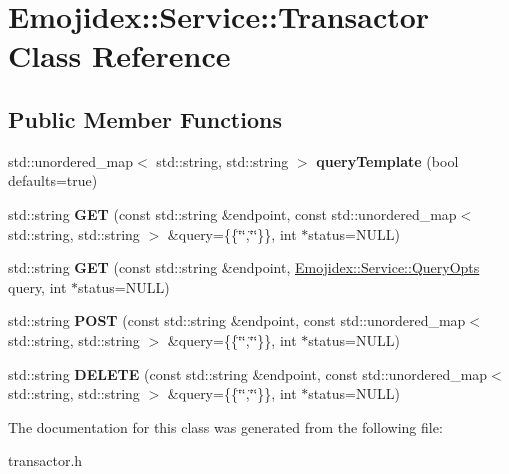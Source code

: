 \hypertarget{classEmojidex_1_1Service_1_1Transactor}{}\section{Emojidex\+:\+:Service\+:\+:Transactor Class Reference}
\label{classEmojidex_1_1Service_1_1Transactor}
\subsection*{Public Member Functions}
\begin{DoxyCompactItemize}
\item 
std\+::unordered\+\_\+map$<$ std\+::string, std\+::string $>$ {\bfseries query\+Template} (bool defaults=true)\hypertarget{classEmojidex_1_1Service_1_1Transactor_acdd10d6f4321b7a221c4bfb0d8590ff2}{}\label{classEmojidex_1_1Service_1_1Transactor_acdd10d6f4321b7a221c4bfb0d8590ff2}

\item 
std\+::string {\bfseries G\+ET} (const std\+::string \&endpoint, const std\+::unordered\+\_\+map$<$ std\+::string, std\+::string $>$ \&query=\{\{\char`\"{}\char`\"{},\char`\"{}\char`\"{}\}\}, int $\ast$status=N\+U\+LL)\hypertarget{classEmojidex_1_1Service_1_1Transactor_ad7db57d801c905c92ea81d0ae8e565b7}{}\label{classEmojidex_1_1Service_1_1Transactor_ad7db57d801c905c92ea81d0ae8e565b7}

\item 
std\+::string {\bfseries G\+ET} (const std\+::string \&endpoint, \hyperlink{classEmojidex_1_1Service_1_1QueryOpts}{Emojidex\+::\+Service\+::\+Query\+Opts} query, int $\ast$status=N\+U\+LL)\hypertarget{classEmojidex_1_1Service_1_1Transactor_aa21e59443304d5e9612981f4d7df4e8c}{}\label{classEmojidex_1_1Service_1_1Transactor_aa21e59443304d5e9612981f4d7df4e8c}

\item 
std\+::string {\bfseries P\+O\+ST} (const std\+::string \&endpoint, const std\+::unordered\+\_\+map$<$ std\+::string, std\+::string $>$ \&query=\{\{\char`\"{}\char`\"{},\char`\"{}\char`\"{}\}\}, int $\ast$status=N\+U\+LL)\hypertarget{classEmojidex_1_1Service_1_1Transactor_a5335a34c16a0d16bb0196fda4754b611}{}\label{classEmojidex_1_1Service_1_1Transactor_a5335a34c16a0d16bb0196fda4754b611}

\item 
std\+::string {\bfseries D\+E\+L\+E\+TE} (const std\+::string \&endpoint, const std\+::unordered\+\_\+map$<$ std\+::string, std\+::string $>$ \&query=\{\{\char`\"{}\char`\"{},\char`\"{}\char`\"{}\}\}, int $\ast$status=N\+U\+LL)\hypertarget{classEmojidex_1_1Service_1_1Transactor_a9e9d1edc59867650851b99129b6dcc1d}{}\label{classEmojidex_1_1Service_1_1Transactor_a9e9d1edc59867650851b99129b6dcc1d}

\end{DoxyCompactItemize}


The documentation for this class was generated from the following file\+:\begin{DoxyCompactItemize}
\item 
transactor.\+h\end{DoxyCompactItemize}
